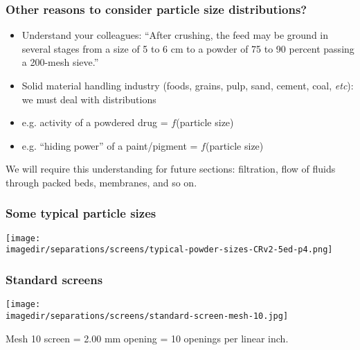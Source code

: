 \begin{frame}\frametitle{Other reasons to consider particle size distributions?}
	\begin{itemize}
		\item	Understand your colleagues: ``After crushing, the feed may be ground in several stages from a size of 5 to 6 cm to a powder of 75 to 90 percent passing a 200-mesh sieve.''
		\item	Solid material handling industry (foods, grains, pulp, sand, cement, coal, \emph{etc}): we must deal with distributions 
		\item	e.g. activity of a powdered drug = $f$(particle size)
		\item	e.g. ``hiding power'' of a paint/pigment = $f$(particle size)
	\end{itemize}
	
	\vspace{12pt}
	\begin{exampleblock}{}
		We will require this understanding for future sections: filtration, flow of fluids through packed beds, membranes, and so on.
	\end{exampleblock}
\end{frame}

\begin{frame}\frametitle{Some typical particle sizes}
	\begin{center}
		\texttt{[image: \\imagedir/separations/screens/typical-powder-sizes-CRv2-5ed-p4.png]}
	\end{center}
\end{frame}

\begin{frame}\frametitle{Standard screens}
	\begin{center}
		\texttt{[image: \\imagedir/separations/screens/standard-screen-mesh-10.jpg]}
	\end{center}
	Mesh 10 screen = 2.00 mm opening = 10 openings per linear inch.
\end{frame}

